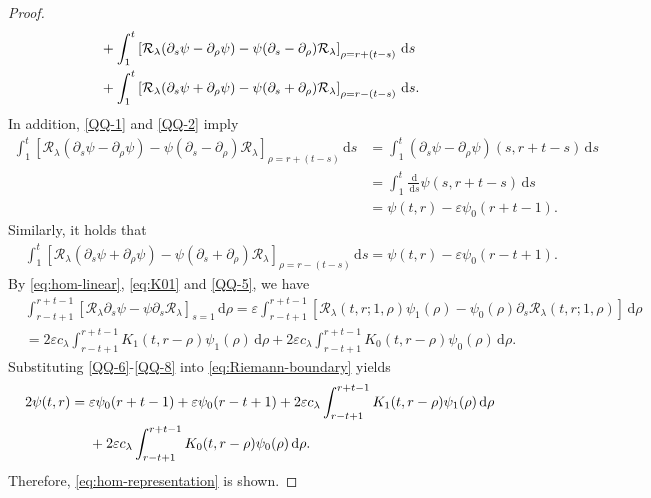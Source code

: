 \documentclass[11pt,twoside]{article}
\newcommand{\p}{\partial}
\newcommand{\ve}{\varepsilon}
\newcommand{\f}{\frac}
\newcommand{\dd}{\,\mathrm{d}}
\newcommand{\Rcal}{\mathcal R}
\theoremstyle{plain}
\theoremstyle{definition}
\theoremstyle{remark}
\numberwithin{equation}{section}
\begin{document}
\begin{proof}
\begin{align}
&+\int_1^t
\left[
\Rcal_\lambda(\p_s\psi-\p_\rho\psi)
-\psi(\p_s-\p_\rho)\Rcal_\lambda
\right]_{\rho=r+(t-s)}\dd s\notag\\
&+\int_1^t
\left[
\Rcal_\lambda(\p_s\psi+\p_\rho\psi)
-\psi(\p_s+\p_\rho)\Rcal_\lambda
\right]_{\rho=r-(t-s)}\dd s.
\label{eq:Riemann-boundary}
\end{align}
In addition, \eqref{QQ-1} and \eqref{QQ-2} imply
\begin{equation}\label{QQ-6}
\begin{aligned}
\int_1^t
\left[
\Rcal_\lambda(\p_s\psi-\p_\rho\psi)
-\psi(\p_s-\p_\rho)\Rcal_\lambda
\right]_{\rho=r+(t-s)}\dd s&
=\int_1^t(\p_s\psi-\p_\rho\psi)(s,r+t-s)\dd s\\
&=\int_1^t\f{\dd}{\dd s}\psi(s,r+t-s)\dd s\\
&=\psi(t,r)-\ve\psi_0(r+t-1).
\end{aligned}
\end{equation}
Similarly, it holds that
\begin{equation}\label{QQ-7}
\begin{aligned}
&\int_1^t
\left[
\Rcal_\lambda(\p_s\psi+\p_\rho\psi)
-\psi(\p_s+\p_\rho)\Rcal_\lambda
\right]_{\rho=r-(t-s)}\dd s
=\psi(t,r)-\ve\psi_0(r-t+1).
\end{aligned}
\end{equation}
By \eqref{eq:hom-linear}, \eqref{eq:K01} and \eqref{QQ-5}, we have
\begin{equation}\label{QQ-8}
\begin{aligned}
&\int_{r-t+1}^{r+t-1}
\left[
\Rcal_\lambda\p_s\psi-\psi\p_s\Rcal_\lambda
\right]_{s=1}\dd\rho=\ve
\int_{r-t+1}^{r+t-1}
\left[
\Rcal_\lambda(t,r;1,\rho)\psi_1(\rho)
-\psi_0(\rho)\p_s\Rcal_\lambda(t,r;1,\rho)
\right]\dd\rho\\
&=2\ve c_\lambda\int_{r-t+1}^{r+t-1}
K_1(t,r-\rho)\psi_1(\rho)\dd\rho
+2\ve c_\lambda\int_{r-t+1}^{r+t-1}
K_0(t,r-\rho)\psi_0(\rho)\dd\rho.
\end{aligned}
\end{equation}
Substituting \eqref{QQ-6}-\eqref{QQ-8} into \eqref{eq:Riemann-boundary} yields
\begin{align}
2\psi(t,r)
={}&\ve\psi_0(r+t-1)+\ve\psi_0(r-t+1)
+2\ve c_\lambda\int_{r-t+1}^{r+t-1}
K_1(t,r-\rho)\psi_1(\rho)\dd\rho\notag\\
&+2\ve c_\lambda\int_{r-t+1}^{r+t-1}
K_0(t,r-\rho)\psi_0(\rho)\dd\rho.
\label{eq:Riemann-hom}
\end{align}
Therefore, \eqref{eq:hom-representation} is shown.
\end{proof}
\end{document}
